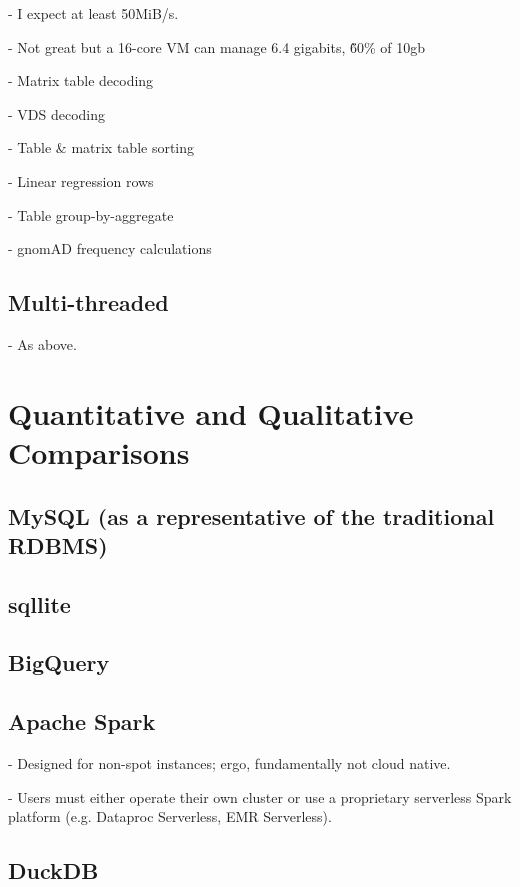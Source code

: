 \documentclass[sigconf, nonacm]{acmart}
\begin{document}
      - I expect at least 50MiB/s.

      - Not great but a 16-core VM can manage 6.4 gigabits, \~60\% of 10gb

    - Matrix table decoding

    - VDS decoding

    - Table \& matrix table sorting

    - Linear regression rows

    - Table group-by-aggregate

    - gnomAD frequency calculations

\subsection{Multi-threaded}

    - As above.

\section{Quantitative and Qualitative Comparisons}

\subsection{MySQL (as a representative of the traditional RDBMS)}

\subsection{sqllite}

\subsection{BigQuery}

\subsection{Apache Spark}

    - Designed for non-spot instances; ergo, fundamentally not cloud native.

    - Users must either operate their own cluster or use a proprietary serverless Spark platform (e.g. Dataproc Serverless, EMR Serverless).

\subsection{DuckDB}
\end{document}
